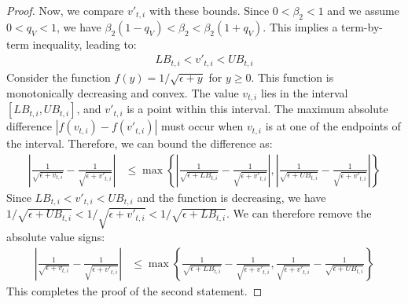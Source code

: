 \documentclass[11pt, letterpaper]{article}
\begin{document}
\begin{proof}
Now, we compare $v'_{t,i}$ with these bounds. Since $0 < \beta_2 < 1$ and we assume $0 < q_V < 1$, we have $\beta_2(1-q_V) < \beta_2 < \beta_2(1+q_V)$. This implies a term-by-term inequality, leading to:
\begin{align}
    LB_{t,i} < v'_{t,i} < UB_{t,i}
\end{align}
Consider the function $f(y) = 1/\sqrt{\epsilon+y}$ for $y \ge 0$. This function is monotonically decreasing and convex. The value $v_{t,i}$ lies in the interval $[LB_{t,i}, UB_{t,i}]$, and $v'_{t,i}$ is a point within this interval. The maximum absolute difference $|f(v_{t,i}) - f(v'_{t,i})|$ must occur when $v_{t,i}$ is at one of the endpoints of the interval. Therefore, we can bound the difference as:
\begin{align}
    \left|\frac{1}{\sqrt{\epsilon+v_{t,i}}}-\frac{1}{\sqrt{\epsilon+v'_{t,i}}}\right| &\le \max\left\{ \left|\frac{1}{\sqrt{\epsilon+LB_{t,i}}} - \frac{1}{\sqrt{\epsilon+v'_{t,i}}}\right|, \left|\frac{1}{\sqrt{\epsilon+UB_{t,i}}} - \frac{1}{\sqrt{\epsilon+v'_{t,i}}}\right| \right\}
\end{align}
Since $LB_{t,i} < v'_{t,i} < UB_{t,i}$ and the function is decreasing, we have $1/\sqrt{\epsilon+UB_{t,i}} < 1/\sqrt{\epsilon+v'_{t,i}} < 1/\sqrt{\epsilon+LB_{t,i}}$. We can therefore remove the absolute value signs:
\begin{align}
    \left|\frac{1}{\sqrt{\epsilon+v_{t,i}}}-\frac{1}{\sqrt{\epsilon+v'_{t,i}}}\right| &\le \max\left\{ \frac{1}{\sqrt{\epsilon+LB_{t,i}}} - \frac{1}{\sqrt{\epsilon+v'_{t,i}}}, \frac{1}{\sqrt{\epsilon+v'_{t,i}}} - \frac{1}{\sqrt{\epsilon+UB_{t,i}}} \right\}
\end{align}
This completes the proof of the second statement.
\end{proof}
\end{document}
